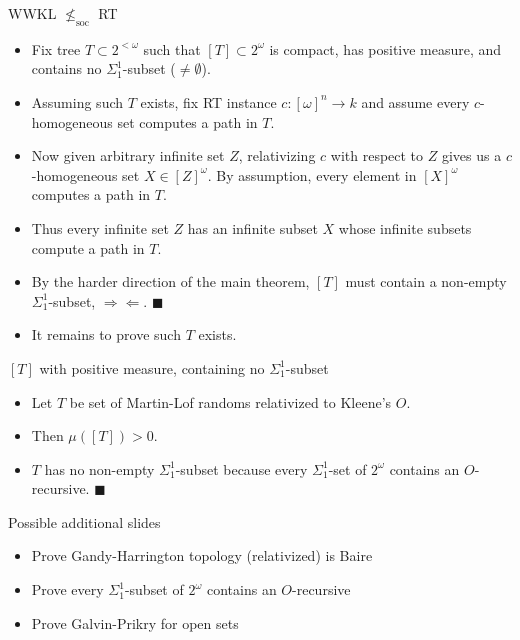 \begin{frame}{WWKL $\nleq_{\text{soc}}$ RT}
  \begin{itemize}
    \item Fix tree $T\subset 2^{<\omega}$ such that
      $[T]\subset 2^\omega$ is compact, has positive measure, and
      contains no $\Sigma_1^1$-subset ($\neq\emptyset$).
    \item Assuming such $T$ exists, fix RT instance
      $c:[\omega]^n\rightarrow k$ and assume every $c$-homogeneous set
      computes a path in $T$.
    \item Now given arbitrary infinite set $Z$, relativizing $c$ with
      respect to $Z$ gives us a $c$-homogeneous set $X\in[Z]^\omega$.
      By assumption, every element in $[X]^\omega$ computes a path in $T$.
    \item Thus every infinite set $Z$ has an infinite subset $X$ whose
      infinite subsets compute a path in $T$.
    \item By the harder direction of the main theorem, $[T]$ must contain a
      non-empty $\Sigma_1^1$-subset, $\Rightarrow\Leftarrow$.
      $\blacksquare$
    \item It remains to prove such $T$ exists.
  \end{itemize}
\end{frame}

\begin{frame}{$[T]$ with positive measure, containing no
$\Sigma_1^1$-subset}
  \begin{itemize}
    \item Let $T$ be set of Martin-Lof randoms relativized to Kleene's $O$.
    \item Then $\mu([T])>0$.
    \item $T$ has no non-empty $\Sigma_1^1$-subset because every
      $\Sigma_1^1$-set of $2^\omega$ contains an $O$-recursive.
      $\blacksquare$
  \end{itemize}
\end{frame}

\begin{frame}{Possible additional slides}
  \begin{itemize}
    \item Prove Gandy-Harrington topology (relativized) is Baire
    \item Prove every $\Sigma_1^1$-subset of $2^\omega$ contains an
      $O$-recursive
    \item Prove Galvin-Prikry for open sets
  \end{itemize}
\end{frame}
